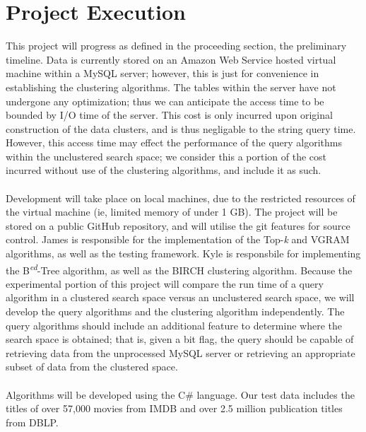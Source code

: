 \documentclass[pdftex,12pt,letter]{article}
\begin{document}
\section{Project Execution}
This project will progress as defined in the proceeding section, the preliminary timeline. Data is currently stored on an Amazon Web Service hosted virtual machine within a MySQL server; however, this is just for convenience in establishing the clustering algorithms. The tables within the server have not undergone any optimization; thus we can anticipate the access time to be bounded by I/O time of the server. This cost is only incurred upon original construction of the data clusters, and is thus negligable to the string query time. However, this access time may effect the performance of the query algorithms within the unclustered search space; we consider this a portion of the cost incurred without use of the clustering algorithms, and include it as such.\\
\\
Development will take place on local machines, due to the restricted resources of the virtual machine (ie, limited memory of under 1 GB). The project will be stored on a public GitHub repository, and will utilise the git features for source control. James is responsible for the implementation of the Top-\textit{k} and VGRAM algorithms, as well as the testing framework. Kyle is responsbile for implementing the B\textsuperscript{\textit{ed}}-Tree algorithm, as well as the BIRCH clustering algorithm. Because the experimental portion of this project will compare the run time of a query algorithm in a clustered search space versus an unclustered search space, we will develop the query algorithms and the clustering algorithm independently. The query algorithms should include an additional feature to determine where the search space is obtained; that is, given a bit flag, the query should be capable of retrieving data from the unprocessed MySQL server or retrieving an appropriate subset of data from the clustered space.\\
\\
Algorithms will be developed using the C\# language. Our test data includes the titles of over 57,000 movies from IMDB and over 2.5 million publication titles from DBLP. 
\end{document}
